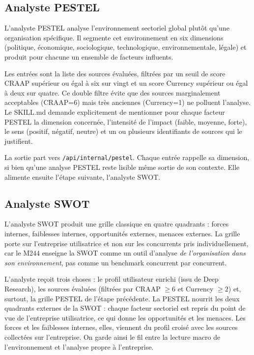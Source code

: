\documentclass[12pt,a4paper,openany]{report}
\begin{document}
\subsection{Analyste PESTEL}
\label{sec:skill-pestel}

L'analyste PESTEL analyse l'environnement sectoriel global plutôt qu'une organisation spécifique. Il segmente cet environnement en six dimensions (politique, économique, sociologique, technologique, environnementale, légale) et produit pour chacune un ensemble de facteurs influents.

Les entrées sont la liste des sources évaluées, filtrées par un seuil de score CRAAP supérieur ou égal à six sur vingt et un score Currency supérieur ou égal à deux sur quatre. Ce double filtre évite que des sources marginalement acceptables (CRAAP=6) mais très anciennes (Currency=1) ne polluent l'analyse. Le SKILL.md demande explicitement de mentionner pour chaque facteur PESTEL la dimension concernée, l'intensité de l'impact (faible, moyenne, forte), le sens (positif, négatif, neutre) et un ou plusieurs identifiants de sources qui le justifient.

La sortie part vers \texttt{/api/internal/pestel}. Chaque entrée rappelle sa dimension, si bien qu'une analyse PESTEL reste lisible même sortie de son contexte. Elle alimente ensuite l'étape suivante, l'analyste SWOT.

\subsection{Analyste SWOT}
\label{sec:skill-swot}

L'analyste SWOT produit une grille classique en quatre quadrants : forces internes, faiblesses internes, opportunités externes, menaces externes. La grille porte sur l'entreprise utilisatrice et non sur les concurrents pris individuellement, car le M244 enseigne la SWOT comme un outil d'analyse \emph{de l'organisation dans son environnement}, pas comme un benchmark concurrent par concurrent.

L'analyste reçoit trois choses : le profil utilisateur enrichi (issu de Deep Research), les sources évaluées (filtrées par CRAAP $\geq 6$ et Currency $\geq 2$) et, surtout, la grille PESTEL de l'étape précédente. La PESTEL nourrit les deux quadrants externes de la SWOT : chaque facteur sectoriel est repris du point de vue de l'entreprise utilisatrice, ce qui donne les opportunités et les menaces. Les forces et les faiblesses internes, elles, viennent du profil croisé avec les sources collectées sur l'entreprise. On garde ainsi le fil entre la lecture macro de l'environnement et l'analyse propre à l'entreprise.
\end{document}
